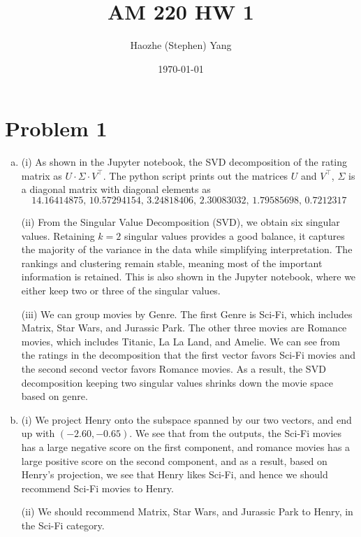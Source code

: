 \documentclass[11pt]{scrartcl}
\begin{document}
\title{AM 220 HW 1}
\author{Haozhe (Stephen) Yang}
\date{\today}
\maketitle

\section{Problem 1}

\begin{enumerate}[(a)]
    \item (i) As shown in the Jupyter notebook, the SVD decomposition of the rating matrix as $U \cdot \Sigma \cdot V^\top$. The python script prints out the matrices $U$ and $V^\top$, $\Sigma$ is a diagonal matrix with diagonal elements as \[14.16414875,\, 10.57294154, \, 3.24818406, \, 2.30083032, \, 1.79585698, \, 0.7212317 \]
    
    (ii) From the Singular Value Decomposition (SVD), we obtain six singular values. Retaining $k=2$ singular values provides a good balance, it captures the majority of the variance in the data while simplifying interpretation. The rankings and clustering remain stable, meaning most of the important information is retained. This is also shown in the Jupyter notebook, where we either keep two or three of the singular values.

    (iii) We can group movies by Genre. The first Genre is Sci-Fi, which includes Matrix, Star Wars, and Jurassic Park. The other three movies are Romance movies, which includes Titanic, La La Land, and Amelie. We can see from the ratings in the decomposition that the first vector favors Sci-Fi movies and the second second vector favors Romance movies. As a result, the SVD decomposition keeping two singular values shrinks down the movie space based on genre.
    \item (i) We project Henry onto the subspace spanned by our two vectors, and end up with $(-2.60, -0.65)$. We see that from the outputs, the Sci-Fi movies has a large negative score on the first component, and romance movies has a large positive score on the second component, and as a result, based on Henry's projection, we see that Henry likes Sci-Fi, and hence we should recommend Sci-Fi movies to Henry.
    
    (ii) We should recommend Matrix, Star Wars, and Jurassic Park to Henry, in the Sci-Fi category.
\end{enumerate}
\end{document}
